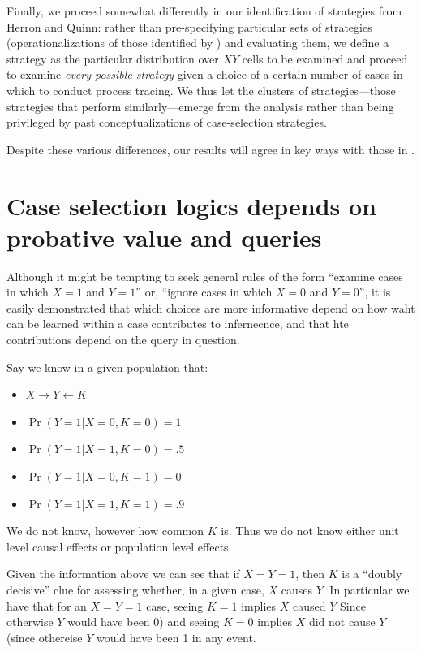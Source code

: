 \documentclass[
  12pt,
]{book}
\providecommand{\tightlist}{%
  \setlength{\itemsep}{0pt}\setlength{\parskip}{0pt}}
\begin{document}
Finally, we proceed somewhat differently in our identification of strategies from Herron and Quinn: rather than pre-specifying particular sets of strategies (operationalizations of those identified by \citet{SeawrightGerring2008}) and evaluating them, we define a strategy as the particular distribution over \(XY\) cells to be examined and proceed to examine \emph{every possible strategy} given a choice of a certain number of cases in which to conduct process tracing. We thus let the clusters of strategies---those strategies that perform similarly---emerge from the analysis rather than being privileged by past conceptualizations of case-selection strategies.

Despite these various differences, our results will agree in key ways with those in \citet{HerronQuinn}.

\hypertarget{case-selection-logics-depends-on-probative-value-and-queries}{%
\section{Case selection logics depends on probative value and queries}\label{case-selection-logics-depends-on-probative-value-and-queries}}

Although it might be tempting to seek general rules of the form ``examine cases in which \(X=1\) and \(Y=1\)'' or, ``ignore cases in which \(X=0\) and \(Y=0\)'', it is easily demonstrated that which choices are more informative depend on how waht can be learned within a case contributes to infernecnce, and that hte contributions depend on the query in question.

Say we know in a given population that:

\begin{itemize}
\tightlist
\item
  \(X \rightarrow Y \leftarrow K\)
\item
  \(\Pr(Y=1|X=0, K = 0) = 1\)
\item
  \(\Pr(Y=1|X=1, K = 0) = .5\)
\item
  \(\Pr(Y=1|X=0, K = 1) = 0\)
\item
  \(\Pr(Y=1|X=1, K = 1) = .9\)
\end{itemize}

We do not know, however how common \(K\) is. Thus we do not know either unit level causal effects or population level effects.

Given the information above we can see that if \(X=Y=1\), then \(K\) is a ``doubly decisive'' clue for assessing whether, in a given case, \(X\) causes \(Y\). In particular we have that for an \(X=Y=1\) case, seeing \(K=1\) implies \(X\) caused \(Y\) Since otherwise \(Y\) would have been 0) and seeing \(K=0\) implies \(X\) did not cause \(Y\) (since othereise \(Y\) would have been 1 in any event.
\end{document}
